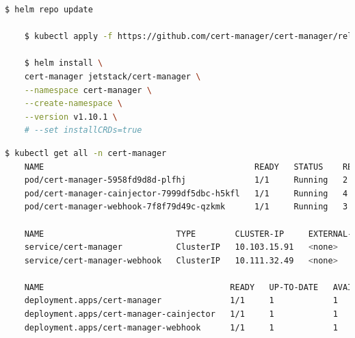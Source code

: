 \documentclass[14pt,a4paper]{report}
\begin{document}
{\begin{lstlisting}[language=Bash]
	$ helm repo update
	
	$ kubectl apply -f https://github.com/cert-manager/cert-manager/releases/download/v1.10.1/cert-manager.crds.yaml
	
	$ helm install \
	cert-manager jetstack/cert-manager \
	--namespace cert-manager \
	--create-namespace \
	--version v1.10.1 \
	# --set installCRDs=true
	\end{lstlisting}
	\hspace{1.0cm}{Sau khi chạy thành công, Cert Manager đã được triển khai thành công trên kubernetes. Để kiểm tra, chúng ta sử dụng câu lệnh sau:}
	\begin{lstlisting}[language=Bash]
	$ kubectl get all -n cert-manager
	NAME                                           READY   STATUS    RESTARTS       AGE
	pod/cert-manager-5958fd9d8d-plfhj              1/1     Running   2 (3h1m ago)   2d22h
	pod/cert-manager-cainjector-7999df5dbc-h5kfl   1/1     Running   4 (3h ago)     2d22h
	pod/cert-manager-webhook-7f8f79d49c-qzkmk      1/1     Running   3 (3h1m ago)   2d22h
	
	NAME                           TYPE        CLUSTER-IP     EXTERNAL-IP   PORT(S)    AGE
	service/cert-manager           ClusterIP   10.103.15.91   <none>        9402/TCP   2d22h
	service/cert-manager-webhook   ClusterIP   10.111.32.49   <none>        443/TCP    2d22h
	
	NAME                                      READY   UP-TO-DATE   AVAILABLE   AGE
	deployment.apps/cert-manager              1/1     1            1           2d22h
	deployment.apps/cert-manager-cainjector   1/1     1            1           2d22h
	deployment.apps/cert-manager-webhook      1/1     1            1           2d22h
	

\end{lstlisting}}
\end{document}
